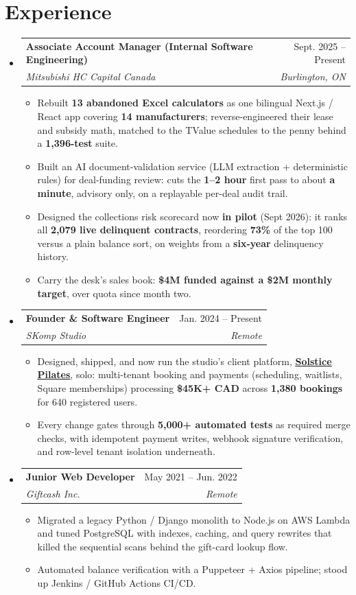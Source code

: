 \documentclass[letterpaper,11pt]{article}
\makeatletter
\newcommand{\resumeItem}[1]{
  \item\small{
    {#1\vspace{-2pt}}
  }
}
\newcommand{\resumeSubheading}[4]{
  \vspace{-2pt}\item
    \begin{tabular*}{0.97\textwidth}[t]{l@{\extracolsep{\fill}}r}
      \textbf{#1} & #2 \\
      \textit{\small#3} & \textit{\small #4} \\
    \end{tabular*}\vspace{-7pt}
}
\newcommand{\resumeSubHeadingListStart}{\begin{itemize}[leftmargin=0.15in, label={}]}
\newcommand{\resumeSubHeadingListEnd}{\end{itemize}}
\newcommand{\resumeItemListStart}{\begin{itemize}}
\newcommand{\resumeItemListEnd}{\end{itemize}\vspace{-5pt}}
\makeatother
\begin{document}
\section{Experience}
  \resumeSubHeadingListStart
    \resumeSubheading
      {Associate Account Manager (Internal Software Engineering)}{Sept. 2025 -- Present}
      {Mitsubishi HC Capital Canada}{Burlington, ON}
      \resumeItemListStart
        \resumeItem{Rebuilt \textbf{13 abandoned Excel calculators} as one bilingual Next.js / React app covering \textbf{14 manufacturers}; reverse-engineered their lease and subsidy math, matched to the TValue schedules to the penny behind a \textbf{1,396-test} suite.}
        \resumeItem{Built an AI document-validation service (LLM extraction + deterministic rules) for deal-funding review: cuts the \textbf{1--2 hour} first pass to about \textbf{a minute}, advisory only, on a replayable per-deal audit trail.}
        \resumeItem{Designed the collections risk scorecard now \textbf{in pilot} (Sept 2026): it ranks all \textbf{2,079 live delinquent contracts}, reordering \textbf{73\%} of the top 100 versus a plain balance sort, on weights from a \textbf{six-year} delinquency history.}
        \resumeItem{Carry the desk's sales book: \textbf{\$4M funded against a \$2M monthly target}, over quota since month two.}
      \resumeItemListEnd
    \resumeSubheading
      {Founder \& Software Engineer}{Jan. 2024 -- Present}
      {SKomp Studio}{Remote}
      \resumeItemListStart
        \resumeItem{Designed, shipped, and now run the studio's client platform, \href{https://www.solsticepilates.ca/}{\underline{\textbf{Solstice Pilates}}}, solo: multi-tenant booking and payments (scheduling, waitlists, Square memberships) processing \textbf{\$45K+ CAD} across \textbf{1,380 bookings} for 640 registered users.}
        \resumeItem{Every change gates through \textbf{5,000+ automated tests} as required merge checks, with idempotent payment writes, webhook signature verification, and row-level tenant isolation underneath.}
      \resumeItemListEnd
    \resumeSubheading
      {Junior Web Developer}{May 2021 -- Jun. 2022}
      {Giftcash Inc.}{Remote}
      \resumeItemListStart
        \resumeItem{Migrated a legacy Python / Django monolith to Node.js on AWS Lambda and tuned PostgreSQL with indexes, caching, and query rewrites that killed the sequential scans behind the gift-card lookup flow.}
        \resumeItem{Automated balance verification with a Puppeteer + Axios pipeline; stood up Jenkins / GitHub Actions CI/CD.}
      \resumeItemListEnd
  \resumeSubHeadingListEnd
\end{document}
